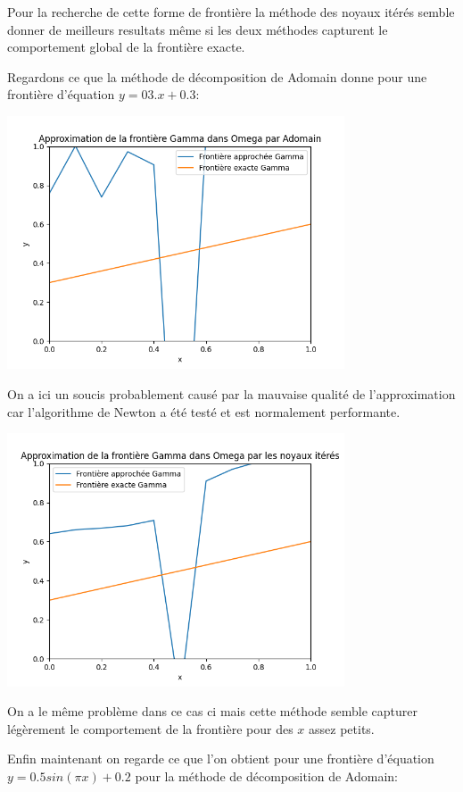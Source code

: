 \documentclass{article}
\begin{document}
Pour la recherche de cette forme de frontière la méthode des noyaux itérés semble donner de meilleurs resultats même si les deux méthodes capturent le comportement global de la frontière exacte.

Regardons ce que la méthode de décomposition de Adomain donne pour une frontière d'équation $y = 03.x + 0.3$:

    {
\includegraphics[width=10cm]{frontiere_affine_adomain.png} \par}
\bigskip

On a ici un soucis probablement causé par la mauvaise qualité de l'approximation car l'algorithme de Newton a été testé et est normalement performante.

    {
\includegraphics[width=10cm]{frontiere_affine_noyaux.png} \par}
\bigskip

On a le même problème dans ce cas ci mais cette méthode semble capturer légèrement le comportement de la frontière pour des $x$ assez petits.

Enfin maintenant on regarde ce que l'on obtient pour une frontière d'équation $y = 0.5sin(\pi x) + 0.2$ pour la méthode de décomposition de Adomain:
\end{document}
